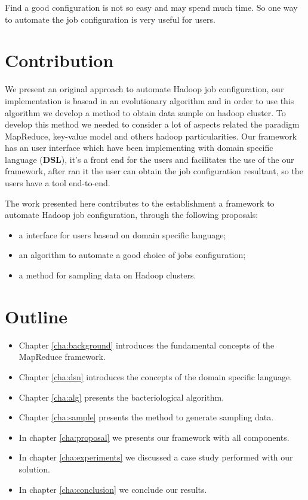 Find a good configuration is not so easy and may spend much time. So
one way to automate the job configuration is very useful for users.

\section{Contribution}

We present an original approach to automate Hadoop job configuration, our
implementation is basead in an evolutionary algorithm \cite{baudry} and in
order to use this algorithm we develop a method to obtain data sample on
hadoop cluster. To develop this method we needed to consider a lot of
aspects related the paradigm MapReduce, key-value model and others hadoop
particularities. Our framework has an user interface which have been implementing
with domain specific language ({\bf DSL}), it's a front end for the users and facilitates the
use of the our framework, after ran it the user can obtain the job configuration
resultant, so the users have a tool end-to-end.

The work presented here contributes to the establishment a framework to automate
Hadoop job configuration, through the following proposals:
\begin{itemize}
	\item a interface for users basead on domain specific language;
	\item an algorithm to automate a good choice of jobs configuration;
	\item a method for sampling data on Hadoop clusters.
\end{itemize}

\section{Outline}

\begin{itemize}
	\item Chapter \ref{cha:background} introduces the fundamental concepts of the MapReduce framework.
	\item Chapter \ref{cha:dsn} introduces the concepts of the domain specific language.
	\item Chapter \ref{cha:alg} presents the bacteriological algorithm.
    \item Chapter \ref{cha:sample} presents the method to generate sampling
    data.
	\item In chapter \ref{cha:proposal} we presents our framework with all components.
    \item In chapter \ref{cha:experiments} we discussed a case study performed with our solution.
	\item In chapter \ref{cha:conclusion} we conclude our results.
\end{itemize}

